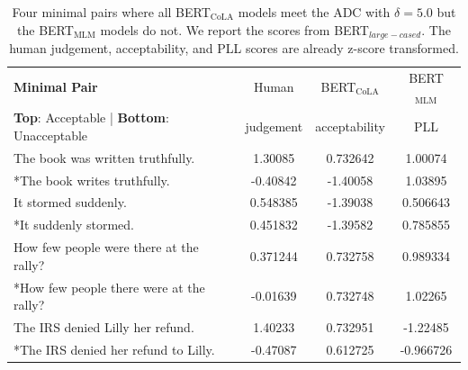 \begin{table}[h]
    \centering
    \begin{tabular}{@{}lccc@{}}
    \toprule
    \textbf{Minimal Pair}                                    & Human & BERT$_{\mathrm{CoLA}}$   & BERT$_{\mathrm{MLM}}$ \\
    \textbf{Top}: Acceptable | \textbf{Bottom}: Unacceptable & judgement & acceptability      & PLL\\
    \toprule
    The book was written truthfully.  & 1.30085 & 0.732642 & 1.00074 \\
    *The book writes truthfully. & -0.40842 & -1.40058 & 1.03895 \\
    \midrule
    It stormed suddenly. & 0.548385 & -1.39038 & 0.506643 \\
    *It suddenly stormed.    & 0.451832 &  -1.39582 & 0.785855 \\
    \midrule
    How few people were there at the rally? & 0.371244 & 0.732758 & 0.989334 \\
    *How few people there were at the rally? & -0.01639 & 0.732748 & 1.02265 \\
    \midrule
    The IRS denied Lilly her refund.  & 1.40233 & 0.732951 & -1.22485 \\
    *The IRS denied her refund to Lilly. & -0.47087 & 0.612725 & -0.966726 \\
    \bottomrule
    \end{tabular}
    \caption[Four minimal pairs where BERT$_{\mathrm{CoLA}}$ meets ADC \newline with $\delta=5.0$ but the BERT$_{\mathrm{MLM}}$ models do not]{Four minimal pairs where all BERT$_{\mathrm{CoLA}}$ models meet the ADC with $\delta=5.0$ but the BERT$_{\mathrm{MLM}}$ models do not. We report the scores from BERT$_{large-cased}$. The human judgement, acceptability, and PLL scores are already z-score transformed. }
    \label{tab:table_18}
\end{table}

